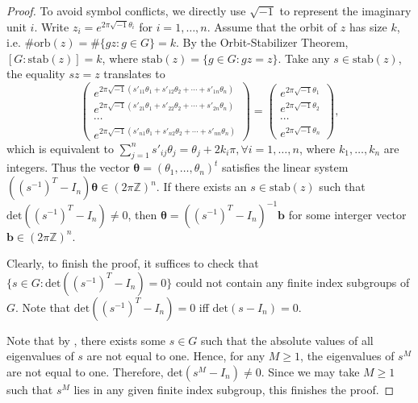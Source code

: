 \documentclass[12pt]{amsart}
\theoremstyle{definition}
\theoremstyle{remark}
\begin{document}
\begin{proof}
To avoid symbol conflicts, we directly use $\sqrt{-1}$ to represent the imaginary unit $i$. Write $z_{i}=e^{2\pi \sqrt{-1} \theta_{i}} $ for $i = 1,\dots,n$. Assume that the orbit of $z$ has size $k$, i.e. $\# \text{orb}(z)=\#\{gz:g\in G\}=k$. By the Orbit-Stabilizer Theorem, $[G:\text{stab}(z)]=k$, where $\text{stab}(z)=\{g\in G :gz=z\}$. Take any $s\in \text{stab}(z)$, the equality $sz=z$ translates to 
\begin{equation*}
\left(\begin{smallmatrix}
    e^{2\pi\sqrt{-1}(s'_{11}\theta_{1} +s'_{12}\theta_{2}+\cdots+s'_{1n}\theta_{n})}\\
     e^{2\pi\sqrt{-1}(s'_{21}\theta_{1} +s'_{22}\theta_{2}+\cdots+s'_{2n}\theta_{n})}\\
     \cdots\\
      e^{2\pi\sqrt{-1}(s'_{n1}\theta_{1} +s'_{n2}\theta_{2}+\cdots+s'_{nn}\theta_{n})}
\end{smallmatrix}\right)
=\left(\begin{smallmatrix}
    e^{2\pi\sqrt{-1}\theta_{1}}\\
     e^{2\pi\sqrt{-1}\theta_{2}}\\
     \cdots\\
      e^{2\pi\sqrt{-1}\theta_{n}}
\end{smallmatrix}\right),
\end{equation*}
which is equivalent to $\sum\limits_{j=1}^ns'_{ij}\theta_{j}=\theta_{j}+2k_i\pi,\forall i=1,\ldots,n$, where $k_{1},\ldots,k_{n}$ are integers. Thus the vector $\boldsymbol{\theta} = (\theta_{1},\dots,\theta_n)^t$ satisfies the linear system $((s^{-1})^T -I_{n})\boldsymbol{\theta} \in (2\pi\mathbb{Z})^n$. If there exists an $s\in \text{stab}(z)$ such that $\text{det}((s^{-1})^{T}-I_{n})\ne0$, then $\boldsymbol{\theta} = ((s^{-1})^T -I_{n})^{-1}\boldsymbol{b}$ for some interger vector $\boldsymbol{b}\in (2\pi\mathbb{Z})^n$. 

Clearly, to finish the proof, it suffices to check that $\{s\in G:\text{det}((s^{-1})^{T}-I_{n})=0\}$ could not contain any finite index subgroups of $G$. Note that $\text{det}((s^{-1})^{T}-I_{n})=0$ iff $\text{det}(s-I_{n})=0$.

Note that by \cite[Proposition 3.4]{jiang_jfa}, there exists some $s\in G$ such that the absolute values of all eigenvalues of $s$ are not equal to one. Hence, for any $M\geq 1$, the eigenvalues of  $s^M$ are not equal to one. Therefore, $\text{det}(s^M-I_{n})\neq 0$. Since we may take $M\geq 1$ such that $s^M$ lies in any given finite index subgroup, this finishes the proof.
\end{proof}
\end{document}

